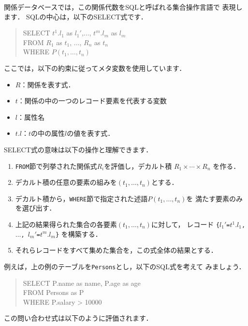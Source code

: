 \documentclass{jbook}
\newenvironment{program}{\begin{tt}\begin{quote}}{\end{quote}\end{tt}}
\begin{document}
	関係データベースでは，この関係代数をSQLと呼ばれる集合操作言語で
表現します．
	SQLの中心は，以下のSELECT式です．
\begin{program}
SELECT $t^1.l_1$ as $l_1'$,$\ldots$, $t^m.l_m$ as $l_m$\\
FROM $R_1$ as $t_1$, $\ldots$, $R_n$ as $t_n$\\
WHERE $P(t_1,\ldots, t_n)$
\end{program}
	ここでは，以下の約束に従ってメタ変数を使用しています．
\begin{itemize}
\item $R$：関係を表す式．
\item $t$：関係の中の一つのレコード要素を代表する変数
\item $l$：属性名
\item $t.l$：$t$の中の属性$l$の値を表す式．
\end{itemize}
	SELECT式の意味は以下の操作と理解できます．
\begin{enumerate}
\item {\tt FROM}節で列挙された関係式$R_i$を評価し，デカルト積
$
R_1 \times \cdots \times R_n
$
を作る．
\item デカルト積の任意の要素の組みを$(t_1,\ldots,t_n)$とする．
\item デカルト積から，{\tt WHERE}節で指定された述語$P(t_1,\ldots,t_n)$を
満たす要素のみを選び出す．
\item
	上記の結果得られた集合の各要素$(t_1,\ldots,t_n)$に対して，
レコード
{\tt \{$l_1'$=$t^1.l_1$, $\ldots$, $l_m'$=$t^m.l_m$\}}
を構築する．
\item それらレコードをすべて集めた集合を，この式全体の結果とする．
\end{enumerate}
	例えば，上の例のテーブルを{\tt Persons}とし，以下のSQL式を考えて
みましょう．
\begin{program}
SELECT P.name as name, P.age as age\\
FROM Persons as P\\
WHERE P.salary > 10000
\end{program}
	この問い合わせ式は以下のように評価されます．
\end{document}
